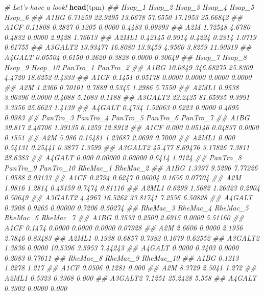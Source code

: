 \documentclass[]{book}
\newenvironment{Shaded}{\begin{snugshade}}{\end{snugshade}}
\newcommand{\CommentTok}[1]{\textcolor[rgb]{0.56,0.35,0.01}{\textit{#1}}}
\newcommand{\KeywordTok}[1]{\textcolor[rgb]{0.13,0.29,0.53}{\textbf{#1}}}
\newcommand{\NormalTok}[1]{#1}
\begin{document}
\begin{Shaded}
\begin{Highlighting}[]
\CommentTok{# Let's have a look!}
\KeywordTok{head}\NormalTok{(tpm)}
\CommentTok{##           Hsap_1  Hsap_2  Hsap_3  Hsap_4  Hsap_5   Hsap_6}
\CommentTok{## A1BG     6.71259 22.9295 13.6678 57.6550 17.1953 25.66842}
\CommentTok{## A1CF     0.11808  0.2827  0.1205  0.0000  0.4483  0.09393}
\CommentTok{## A2M      1.72548  4.6780  0.4832  0.0000  2.9428  1.76613}
\CommentTok{## A2ML1    0.42145  0.9914  0.4224  0.2314  1.0719  0.61755}
\CommentTok{## A3GALT2 13.93477 16.8080 13.9459  4.9560  3.8259 11.90319}
\CommentTok{## A4GALT   0.05504  0.6150  0.2620  0.3828  0.0000  0.30649}
\CommentTok{##          Hsap_7    Hsap_8  Hsap_9 Hsap_10 PanTro_1 PanTro_2}
\CommentTok{## A1BG    10.0849 346.68275 25.8309  4.4720  18.6252   0.4333}
\CommentTok{## A1CF     0.1451   0.05178  0.0000  0.0000   0.0000   0.0000}
\CommentTok{## A2M      1.2366   0.70101  0.7889  0.5345   1.2986   5.7550}
\CommentTok{## A2ML1    0.9538   3.06396  0.0000  0.4088   5.1083   0.1188}
\CommentTok{## A3GALT2 22.2425  81.65935  9.3991  3.3356  25.6623   1.4139}
\CommentTok{## A4GALT   0.4734   1.52063  0.6223  0.0000   0.4695   0.0983}
\CommentTok{##         PanTro_3 PanTro_4 PanTro_5 PanTro_6 PanTro_7}
\CommentTok{## A1BG      39.817  2.46706  1.39135   6.1259  12.8912}
\CommentTok{## A1CF       0.000  0.05146  0.04837   0.0000   0.1551}
\CommentTok{## A2M        5.986  0.15481  1.23687   2.0699   0.7000}
\CommentTok{## A2ML1      0.000  0.54131  0.25441   0.3877   1.3599}
\CommentTok{## A3GALT2   45.477  8.69476  3.17826   7.3811  28.6383}
\CommentTok{## A4GALT     0.000  0.00000  0.00000   0.6414   1.0124}
\CommentTok{##         PanTro_8 PanTro_9 PanTro_10 RheMac_1 RheMac_2}
\CommentTok{## A1BG      1.3397   9.5296   7.77226   1.0588  2.03133}
\CommentTok{## A1CF      0.2794   0.6247   0.06004   0.1656  0.07704}
\CommentTok{## A2M       1.9816   1.2814   0.45159   0.7474  0.81116}
\CommentTok{## A2ML1     0.6299   1.5682   1.26323   0.2904  0.50649}
\CommentTok{## A3GALT2   4.4967  16.5262  33.81741   7.2556  6.50828}
\CommentTok{## A4GALT    0.3908   0.9265   0.00000   0.7206  0.50274}
\CommentTok{##         RheMac_3 RheMac_4 RheMac_5 RheMac_6 RheMac_7}
\CommentTok{## A1BG      0.3533   0.2500   2.6915   0.0000  5.51160}
\CommentTok{## A1CF      0.1474   0.0000   0.0000   0.0000  0.07928}
\CommentTok{## A2M       2.6606   0.0000   2.1956   2.7846  0.83483}
\CommentTok{## A2ML1     0.1938   0.6857   0.7382   0.1679  0.62552}
\CommentTok{## A3GALT2   1.3836   0.0000  10.5396   3.5953  7.44243}
\CommentTok{## A4GALT    0.0000   0.3403   0.0000   0.2083  0.77611}
\CommentTok{##         RheMac_8 RheMac_9 RheMac_10}
\CommentTok{## A1BG      0.1213   1.2278     1.217}
\CommentTok{## A1CF      0.0506   0.1281     0.000}
\CommentTok{## A2M       8.3729   2.5041     1.272}
\CommentTok{## A2ML1     0.5323   0.3368     0.000}
\CommentTok{## A3GALT2   7.1251  25.2428     5.558}
\CommentTok{## A4GALT    0.3302   0.0000     0.000}


\end{Highlighting}
\end{Shaded}
\end{document}
